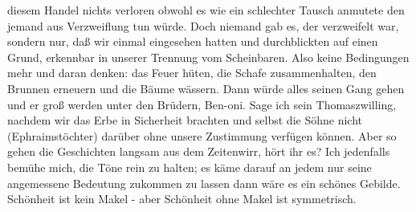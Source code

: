 \documentclass[
]{article}
\begin{document}
diesem Handel nichts verloren obwohl es wie ein schlechter Tausch
anmutete den jemand aus Verzweiflung tun würde. Doch niemand gab es, der
verzweifelt war, sondern nur, daß wir einmal eingesehen hatten und
durchblickten auf einen Grund, erkennbar in unserer Trennung vom
Scheinbaren. Also keine Bedingungen mehr und daran denken: das Feuer
hüten, die Schafe zusammenhalten, den Brunnen erneuern und die Bäume
wässern. Dann würde alles seinen Gang gehen und er groß werden unter den
Brüdern, Ben-oni. Sage ich sein Thomaszwilling, nachdem wir das Erbe in
Sicherheit brachten und selbst die Söhne nicht (Ephraimstöchter) darüber
ohne unsere Zustimmung verfügen können. Aber so gehen die Geschichten
langsam aus dem Zeitenwirr, hört ihr es? Ich jedenfalls bemühe mich, die
Töne rein zu halten; es käme darauf an jedem nur seine angemessene
Bedeutung zukommen zu lassen dann wäre es ein schönes Gebilde. Schönheit
ist kein Makel - aber Schönheit ohne Makel ist symmetrisch.
\end{document}
